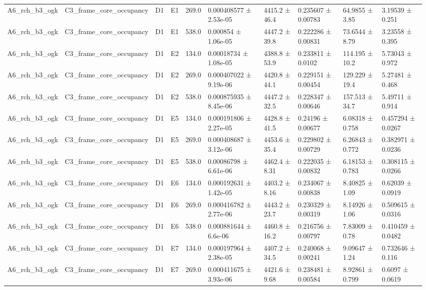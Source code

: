 \begin{table}
\begin{tabular}{llllllllll}
A6\_rch\_b3\_ogk & C3\_frame\_core\_occupancy & D1 & E1 & 269.0 & 0.000408577 ± 2.53e-05 & 4415.2 ± 46.4 & 0.235607 ± 0.00783 & 64.9855 ± 3.85 & 3.19539 ± 0.251 \\
A6\_rch\_b3\_ogk & C3\_frame\_core\_occupancy & D1 & E1 & 538.0 & 0.000854 ± 1.06e-05 & 4447.2 ± 39.8 & 0.222286 ± 0.00831 & 73.6544 ± 8.79 & 3.23558 ± 0.395 \\
A6\_rch\_b3\_ogk & C3\_frame\_core\_occupancy & D1 & E2 & 134.0 & 0.00018734 ± 1.08e-05 & 4388.8 ± 53.9 & 0.233811 ± 0.0102 & 114.195 ± 10.2 & 5.73043 ± 0.972 \\
A6\_rch\_b3\_ogk & C3\_frame\_core\_occupancy & D1 & E2 & 269.0 & 0.000407022 ± 9.19e-06 & 4420.8 ± 44.1 & 0.229151 ± 0.00454 & 129.229 ± 19.4 & 5.27481 ± 0.468 \\
A6\_rch\_b3\_ogk & C3\_frame\_core\_occupancy & D1 & E2 & 538.0 & 0.000875935 ± 8.45e-06 & 4447.2 ± 32.5 & 0.228347 ± 0.00646 & 157.513 ± 34.7 & 5.49711 ± 0.914 \\
A6\_rch\_b3\_ogk & C3\_frame\_core\_occupancy & D1 & E5 & 134.0 & 0.000191806 ± 2.27e-05 & 4428.8 ± 41.5 & 0.24196 ± 0.00677 & 6.08318 ± 0.758 & 0.457294 ± 0.0267 \\
A6\_rch\_b3\_ogk & C3\_frame\_core\_occupancy & D1 & E5 & 269.0 & 0.000408687 ± 3.12e-06 & 4453.6 ± 35.4 & 0.229802 ± 0.00729 & 6.26843 ± 0.772 & 0.382971 ± 0.0236 \\
A6\_rch\_b3\_ogk & C3\_frame\_core\_occupancy & D1 & E5 & 538.0 & 0.00086798 ± 6.61e-06 & 4462.4 ± 8.31 & 0.222035 ± 0.00832 & 6.18153 ± 0.783 & 0.308115 ± 0.0266 \\
A6\_rch\_b3\_ogk & C3\_frame\_core\_occupancy & D1 & E6 & 134.0 & 0.000192631 ± 1.42e-05 & 4403.2 ± 8.16 & 0.234067 ± 0.00838 & 8.40825 ± 1.09 & 0.62039 ± 0.0919 \\
A6\_rch\_b3\_ogk & C3\_frame\_core\_occupancy & D1 & E6 & 269.0 & 0.000416782 ± 2.77e-06 & 4443.2 ± 23.7 & 0.230329 ± 0.00319 & 8.14926 ± 1.06 & 0.509615 ± 0.0316 \\
A6\_rch\_b3\_ogk & C3\_frame\_core\_occupancy & D1 & E6 & 538.0 & 0.000881644 ± 6.6e-06 & 4460.8 ± 16.2 & 0.216756 ± 0.00797 & 7.83009 ± 0.78 & 0.410459 ± 0.0482 \\
A6\_rch\_b3\_ogk & C3\_frame\_core\_occupancy & D1 & E7 & 134.0 & 0.000197964 ± 2.38e-05 & 4407.2 ± 34.5 & 0.240068 ± 0.00241 & 9.09647 ± 1.24 & 0.732646 ± 0.116 \\
A6\_rch\_b3\_ogk & C3\_frame\_core\_occupancy & D1 & E7 & 269.0 & 0.000411675 ± 3.93e-06 & 4421.6 ± 9.68 & 0.238481 ± 0.00584 & 8.92861 ± 0.799 & 0.6097 ± 0.0619 \\

\end{tabular}
\end{table}

